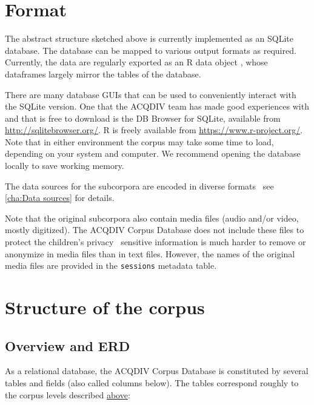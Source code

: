 \documentclass[a4paper, 11pt]{book}
\begin{document}
\section{Format}
\label{sec:Format}

The abstract structure sketched above is currently implemented as an SQLite database. The database can be mapped to various output formats as required. Currently, the data are regularly exported as an R data object \citep{RCoreTeam2015}, whose dataframes largely mirror the tables of the database. 

There are many database GUIs that can be used to conveniently interact with the SQLite version. One that the ACQDIV team has made good experiences with and that is free to download is the DB Browser for SQLite, available from \url{http://sqlitebrowser.org/}. R is freely available from \url{https://www.r-project.org/}. Note that in either environment the corpus may take some time to load, depending on your system and computer. We recommend opening the database locally to save working memory. 

The data sources for the subcorpora are encoded in diverse formats \textendash\ see \autoref{cha:Data sources} for details. 

Note that the original subcorpora also contain media files (audio and/or video, mostly digitized). The ACQDIV Corpus Database does not include these files to protect the children’s privacy \textendash\ sensitive information is much harder to remove or anonymize in media files than in text files. However, the names of the original media files are provided in the \texttt{sessions} metadata table. 


\section{Structure of the corpus}
\label{sec:Structure of the corpus}


\subsection{Overview and ERD}

As a relational database, the ACQDIV Corpus Database is constituted by several tables and fields (also called columns below). The tables correspond roughly to the corpus levels described \hyperref[sec:Architecture]{above}: 
\end{document}
